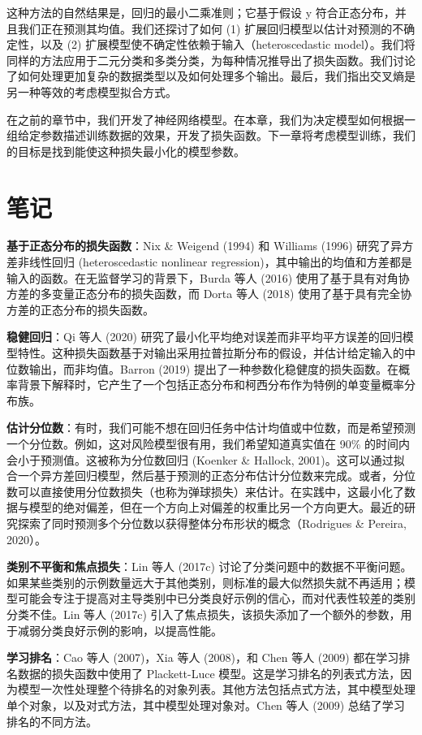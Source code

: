 \documentclass[lang=cn,newtx,10pt,scheme=chinese]{elegantbook}
\begin{document}
这种方法的自然结果是，回归的最小二乘准则；它基于假设 y 符合正态分布，并且我们正在预测其均值。我们还探讨了如何 (1) 扩展回归模型以估计对预测的不确定性，以及 (2) 扩展模型使不确定性依赖于输入（heteroscedastic model）。我们将同样的方法应用于二元分类和多类分类，为每种情况推导出了损失函数。我们讨论了如何处理更加复杂的数据类型以及如何处理多个输出。最后，我们指出交叉熵是另一种等效的考虑模型拟合方式。

在之前的章节中，我们开发了神经网络模型。在本章，我们为决定模型如何根据一组给定参数描述训练数据的效果，开发了损失函数。下一章将考虑模型训练，我们的目标是找到能使这种损失最小化的模型参数。

\section{笔记}

\textbf{基于正态分布的损失函数}：Nix \& Weigend (1994) 和 Williams (1996) 研究了异方差非线性回归 (heteroscedastic nonlinear regression)，其中输出的均值和方差都是输入的函数。在无监督学习的背景下，Burda 等人 (2016) 使用了基于具有对角协方差的多变量正态分布的损失函数，而 Dorta 等人 (2018) 使用了基于具有完全协方差的正态分布的损失函数。

\textbf{稳健回归}：Qi 等人 (2020) 研究了最小化平均绝对误差而非平均平方误差的回归模型特性。这种损失函数基于对输出采用拉普拉斯分布的假设，并估计给定输入的中位数输出，而非均值。Barron (2019) 提出了一种参数化稳健度的损失函数。在概率背景下解释时，它产生了一个包括正态分布和柯西分布作为特例的单变量概率分布族。

\textbf{估计分位数}：有时，我们可能不想在回归任务中估计均值或中位数，而是希望预测一个分位数。例如，这对风险模型很有用，我们希望知道真实值在 90\% 的时间内会小于预测值。这被称为分位数回归 (Koenker \& Hallock, 2001)。这可以通过拟合一个异方差回归模型，然后基于预测的正态分布估计分位数来完成。或者，分位数可以直接使用分位数损失（也称为弹球损失）来估计。在实践中，这最小化了数据与模型的绝对偏差，但在一个方向上对偏差的权重比另一个方向更大。最近的研究探索了同时预测多个分位数以获得整体分布形状的概念（Rodrigues \& Pereira, 2020）。

\textbf{类别不平衡和焦点损失}：Lin 等人 (2017c) 讨论了分类问题中的数据不平衡问题。如果某些类别的示例数量远大于其他类别，则标准的最大似然损失就不再适用；模型可能会专注于提高对主导类别中已分类良好示例的信心，而对代表性较差的类别分类不佳。Lin 等人 (2017c) 引入了焦点损失，该损失添加了一个额外的参数，用于减弱分类良好示例的影响，以提高性能。

\textbf{学习排名}：Cao 等人 (2007)，Xia 等人 (2008)，和 Chen 等人 (2009) 都在学习排名数据的损失函数中使用了 Plackett-Luce 模型。这是学习排名的列表式方法，因为模型一次性处理整个待排名的对象列表。其他方法包括点式方法，其中模型处理单个对象，以及对式方法，其中模型处理对象对。Chen 等人 (2009) 总结了学习排名的不同方法。
\end{document}
